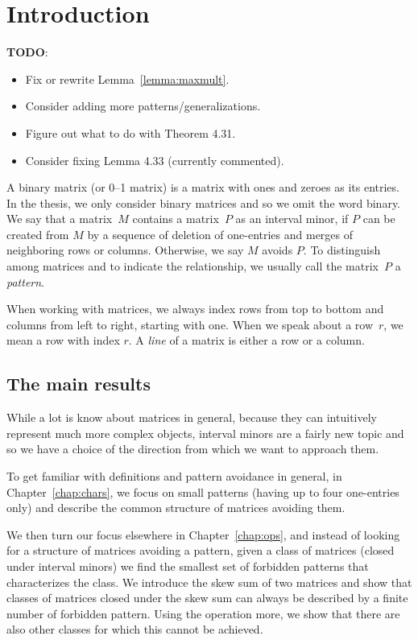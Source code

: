 \chapter{Introduction}
\textbf{TODO}:
\begin{itemize}
	\item Fix or rewrite Lemma~\ref{lemma:maxmult}.
	\item Consider adding more patterns/generalizations.
	\item Figure out what to do with Theorem 4.31.
	\item Consider fixing Lemma 4.33 (currently commented).
\end{itemize}

A binary matrix (or 0--1 matrix) is a matrix with ones and zeroes as its entries. In the thesis, we only consider binary matrices and so we omit the word binary. We say that a matrix~$M$ contains a matrix~$P$ as an interval minor, if $P$ can be created from $M$ by a sequence of deletion of one-entries and merges of neighboring rows or columns. Otherwise, we say $M$ avoids $P$. To distinguish among matrices and to indicate the relationship, we usually call the matrix~$P$ a \emph{pattern}.

When working with matrices, we always index rows from top to bottom and columns from left to right, starting with one. When we speak about a row~$r$, we mean a row with index $r$. A \emph{line} of a matrix is either a row or a column.

\section{The main results}
While a lot is know about matrices in general, because they can intuitively represent much more complex objects, interval minors are a fairly new topic and so we have a choice of the direction from which we want to approach them.

To get familiar with definitions and pattern avoidance in general, in Chapter~\ref{chap:chars}, we focus on small patterns (having up to four one-entries only) and describe the common structure of matrices avoiding them.

We then turn our focus elsewhere in Chapter~\ref{chap:ops}, and instead of looking for a structure of matrices avoiding a pattern, given a class of matrices (closed under interval minors) we find the smallest set of forbidden patterns that characterizes the class. We introduce the skew sum of two matrices and show that classes of matrices closed under the skew sum can always be described by a finite number of forbidden pattern. Using the operation more, we show that there are also other classes for which this cannot be achieved.

